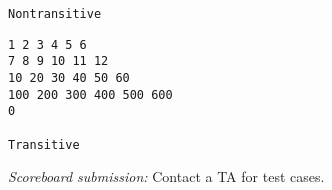 \documentclass[11pt]{cselabheader}
\theoremstyle{plain}
\begin{document}
\begin{enumerate}
\begin{minipage}{.5\linewidth}
\begin{minipage}{.9\linewidth}
\begin{lstlisting}[style=bash]
Nontransitive
        \end{lstlisting}
      \end{minipage}
    \end{minipage}
    \begin{minipage}{.5\linewidth}
      \begin{minipage}{.9\linewidth}
        \begin{lstlisting}[style=bash]
1 2 3 4 5 6
7 8 9 10 11 12
10 20 30 40 50 60
100 200 300 400 500 600
0

Transitive
        \end{lstlisting}
      \end{minipage}
    \end{minipage}

    \textit{Scoreboard submission:} Contact a TA for test cases.
\end{enumerate}
\pagebreak
\end{document}
